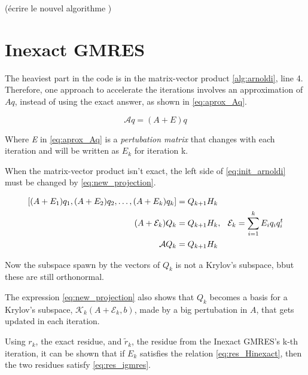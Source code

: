     (écrire le nouvel algorithme )

    \section{Inexact GMRES}

    The heaviest part in the code is in the matrix-vector product \ref{alg:arnoldi}, line 4. Therefore, one approach to accelerate the iterations involves an approximation of $Aq $, instead of using the exact answer, as shown in \ref{eq:aprox_Aq}.

    \begin{equation}\label{eq:aprox_Aq}
        \mathcal{A}q = (A + E)q
    \end{equation}
    
    Where \textit{E} in \ref{eq:aprox_Aq} is a \textit{pertubation matrix} that changes with each iteration and will be written as $E_{k}$ for iteration k.

    When the matrix-vector product isn't exact, the left side of \ref{eq:init_arnoldi} must be changed by \ref{eq:new_projection}.


    \begin{align} \label{eq:new_projection}
    \begin{split}
        [(A + E_{1})q_{1}, (A + E_{2})q_{2},\dots, (A + E_{k})q_{k}] &= Q_{k+1}H_{k}\\ 
        (A + \mathcal{E}_{k})Q_{k} &= Q_{k+1}H_{k}, \hspace{0.1in} \mathcal{E}_{k} = \sum_{i=1}^{k}E_{i}q_{i}q_{i}^{t}\\
        \mathcal{A}Q_{k} &= Q_{k+1}H_{k}
    \end{split}
    \end{align}

    Now the subspace spawn by the vectors of $Q_{k}$ is not a Krylov's subspace, bbut these are still orthonormal.
    
    The expression \ref{eq:new_projection} also shows that $Q_{k}$ becomes a basis for a Krylov's subspace, $\mathcal{K}_{k}(A+\mathcal{E}_{k},b)$, made by a big pertubation in $A$, that gets updated in each iteration.
    
    Using $r_{k}$, the exact residue, and $\tilde{r}_{k}$, the residue from the Inexact GMRES's k-th iteration, it can be shown \cite{simoncini2003theory} that if $E_{k}$ satisfies the relation \ref{eq:res_Hinexact}, then the two residues satisfy \ref{eq:res_igmres}.


